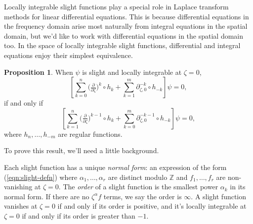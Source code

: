 \documentclass{article}
\theoremstyle{definition}
\newcommand{\Z}{\mathbb{Z}}
\newcommand{\fracderiv}[3]{\partial^{#1}_{#2, #3}}
\newtheorem{prop}[definition]{Proposition}
\begin{document}
Locally integrable slight functions play a special role in Laplace transform methods for linear differential equations. This is because differential equations in the frequency domain arise most naturally from integral equations in the spatial domain, but we'd like to work with differential equations in the spatial domain too. In the space of locally integrable slight functions, differential and integral equations enjoy their simplest equivalence.
\begin{prop}\label{prop:shifting}
When $\psi$ is slight and locally integrable at $\zeta = 0$,
\[ \left[ \sum_{k = 0}^n \big(\tfrac{\partial}{\partial \zeta}\big)^k \circ h_k + \sum_{k = 1}^m \fracderiv{-k}{\zeta}{0} \circ h_{-k} \right] \psi = 0, \]
if and only if
\[ \left[ \sum_{k = 1}^n \big(\tfrac{\partial}{\partial \zeta}\big)^{k-1} \circ h_k + \sum_{k = 0}^m \fracderiv{-k-1}{\zeta}{0} \circ h_{-k} \right] \psi = 0, \]
where $h_n, \ldots, h_{-m}$ are regular functions.
\end{prop}
To prove this result, we'll need a little background.

Each slight function has a unique {\em normal form}: an expression of the form (\ref{eqn:slight-defn}) where $\alpha_1, \ldots, \alpha_r$ are distinct modulo $\Z$ and $f_1, \ldots, f_r$ are non-vanishing at $\zeta = 0$. The {\em order} of a slight function is the smallest power $\alpha_k$ in its normal form. If there are no $\zeta^\alpha f$ terms, we say the order is $\infty$. A slight function vanishes at $\zeta = 0$ if and only if its order is positive, and it's locally integrable at $\zeta = 0$ if and only if its order is greater than $-1$.
\end{document}
